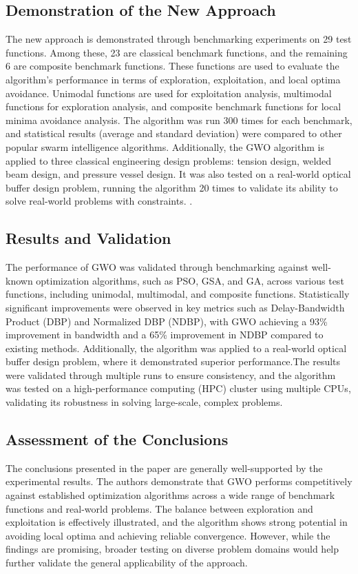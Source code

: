 \documentclass[a4paper, 12pt]{extarticle}
\begin{document}
\subsection{Demonstration of the New Approach}
The new approach is demonstrated through benchmarking experiments on 29 test functions. Among these, 23 are classical benchmark functions, and the remaining 6 are composite benchmark functions. These functions are used to evaluate the algorithm’s performance in terms of exploration, exploitation, and local optima avoidance. Unimodal functions are used for exploitation analysis, multimodal functions for exploration analysis, and composite benchmark functions for local minima avoidance analysis. The algorithm was run 300 times for each benchmark, and statistical results (average and standard deviation) were compared to other popular swarm intelligence algorithms.   Additionally, the GWO algorithm is applied to three classical engineering design problems: tension design, welded beam design, and pressure vessel design. It was also tested on a real-world optical buffer design problem, running the algorithm 20 times to validate its ability to solve real-world problems with constraints. \cite{mirjalili2016multi}.

\subsection{Results and Validation}
The performance of GWO was validated through benchmarking against well-known optimization algorithms, such as PSO, GSA, and GA, across various test functions, including unimodal, multimodal, and composite functions. Statistically significant improvements were observed in key metrics such as Delay-Bandwidth Product (DBP) and Normalized DBP (NDBP), with GWO achieving a 93\% improvement in bandwidth and a 65\% improvement in NDBP compared to existing methods. Additionally, the algorithm was applied to a real-world optical buffer design problem, where it demonstrated superior performance.The results were validated through multiple runs to ensure consistency, and the algorithm was tested on a high-performance computing (HPC) cluster using multiple CPUs, validating its robustness in solving large-scale, complex problems.

\subsection{Assessment of the Conclusions}
The conclusions presented in the paper are generally well-supported by the experimental results. The authors demonstrate that GWO performs competitively against established optimization algorithms across a wide range of benchmark functions and real-world problems. The balance between exploration and exploitation is effectively illustrated, and the algorithm shows strong potential in avoiding local optima and achieving reliable convergence. However, while the findings are promising, broader testing on diverse problem domains would help further validate the general applicability of the approach. 
\end{document}
